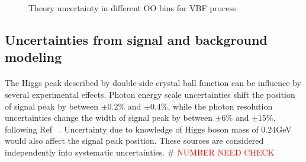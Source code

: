 \begin{figure}[htbp]
\centering
  \caption{Theory uncertainty in different OO bins for VBF process}
  \label{fig:theoryUnc_VBF}
\end{figure}




\subsection{Uncertainties from signal and background modeling}
\label{ssec:modeluncert}

\paragraph{} The Higgs peak described by double-side crystal ball function can be influence by several experimental effects. 
Photon energy scale uncertainties shift the position of signal peak by between $\pm0.2\%$ and $\pm0.4\%$, while the photon resolution uncertainties change the width of signal peak by between $\pm 6\%$ and $\pm 15\%$, following Ref ~\cite{ref:phscaleres}. 
Uncertainty due to knowledge of Higgs boson mass of 0.24GeV ~\cite{ref:mHerror} would also affect the signal peak position. 
These sources are considered independently into systematic uncertainties. 
\# \textcolor{red}{NUMBER NEED CHECK}
